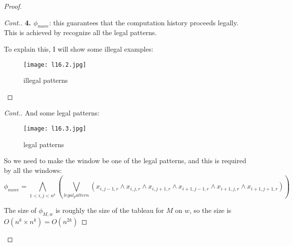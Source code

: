 \begin{proof}
\begin{proof}[Cont.]
        \textbf{4. \(\phi_{move}\)}: this guarantees that the computation history proceeds legally. 
        This is achieved by recognize all the legal patterns.

        To explain this, I will show some illegal examples:
        \begin{figure}[H]
            \centering 
            \texttt{[image: l16.2.jpg]}
            \caption{illegal patterns}
        \end{figure}
    \end{proof}
    \begin{proof}[Cont.]
        And some legal patterns:
        \begin{figure}[H]
            \centering 
            \texttt{[image: l16.3.jpg]}
            \caption{legal patterns}
        \end{figure}

        So we need to make the window be one of the legal patterns, and this is required by all the windows:
        \[
            \phi_{move} = \bigwedge_{1<i,j<n^k}
            (
                \bigvee_{legal_pattern}
                (
                    x_{i, j-1, r} \land
                    x_{i, j, r} \land
                    x_{i, j+1, r} \land
                    x_{i+1, j-1, r} \land
                    x_{i+1, j, r} \land
                    x_{i+1, j+1, r}
                )
            )
        \]

        The size of \(\phi_{M, w}\) is roughly the size of the tableau for \(M\) on \(w\), so the size is \(O(n^k \times n^k) = O(n^{2k})\)    

    \end{proof}
\end{proof}

